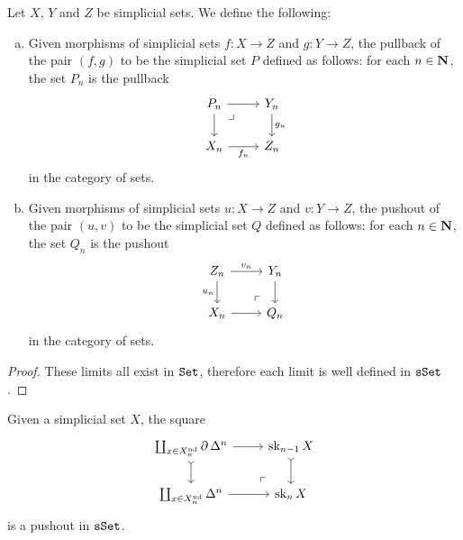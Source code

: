 \begin{corollary}
\label{cor:pushout-and-pullback-of-simplicial-sets}
Let \(X\), \(Y\) and \(Z\) be simplicial sets. We define the following:
\begin{enumerate}[(a)]\setlength\itemsep{0em}
\item Given morphisms of simplicial sets \(f: X \to Z\) and \(g: Y \to Z\), the
  pullback of the pair \((f, g)\) to be the simplicial set \(P\) defined as
  follows: for each \(n \in \mathbf{N}\), the set \(P_n\) is the pullback
  \[
  \begin{tikzcd}
  P_n \ar[rd, phantom, "\lrcorner", very near start]
  \ar[r] \ar[d]
  &Y_n \ar[d, "g_n"] \\
  X_n \ar[r, "f_n"']
  &Z_n
  \end{tikzcd}
  \]
  in the category of sets.
\item Given morphisms of simplicial sets \(u: X \to Z\) and \(v: Y \to Z\), the
  pushout of the pair \((u, v)\) to be the simplicial set \(Q\) defined as
  follows: for each \(n \in \mathbf{N}\), the set \(Q_n\) is the pushout
  \[
  \begin{tikzcd}
  Z_n \ar[rd, phantom, "\ulcorner", very near end]
  \ar[r, "v_n"] \ar[d, "u_n"']
  &Y_n \ar[d] \\
  X_n \ar[r]
  &Q_n
  \end{tikzcd}
  \]
  in the category of sets.
\end{enumerate}
\end{corollary}

\begin{proof}
These limits all exist in \({\texttt{Set}}\), therefore each limit is well defined in
\({\texttt{sSet}}\).
\end{proof}

\begin{proposition}
\label{prop:filtration-attaching-cells}
Given a simplicial set \(X\), the square
\[
\begin{tikzcd}
\coprod_{x \in X_n^{\Nondeg}} \Bd \Delta^n
\ar[rd, phantom, very near end, "\ulcorner"]
\ar[r] \ar[d, tail]
&\Sk_{n-1} X \ar[d, tail]
\\
\coprod_{x \in X_n^{\Nondeg}} \Delta^n
\ar[r]
&\Sk_n X
\end{tikzcd}
\]
is a pushout in \({\texttt{sSet}}\).
\end{proposition}

